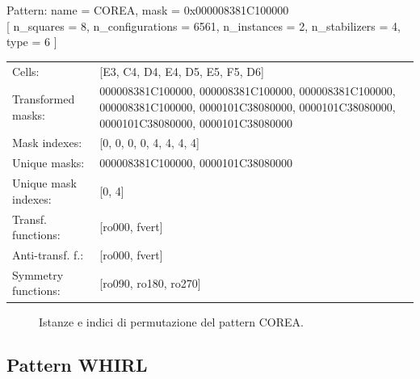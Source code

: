 \begin{tcolorbox}[sharp corners, fontupper=\ttfamily\small, colback=white]
  \noindent Pattern: name = COREA, mask = 0x000008381C100000\\
  {[} n\_squares = 8, n\_configurations = 6561,
  n\_instances = 2, n\_stabilizers = 4, type = 6 { ]}\\[1.0ex]
  \begin{tabularx}{\textwidth}{@{} p{3.5cm} X @{}}
    Cells:               & {[}E3, C4, D4, E4, D5, E5, F5, D6{]}\\[0.5ex]
    Transformed masks:   & 000008381C100000, 000008381C100000, 000008381C100000, 000008381C100000, 0000101C38080000, 0000101C38080000, 0000101C38080000, 0000101C38080000\\[0.5ex]
    Mask indexes:        & {[}0, 0, 0, 0, 4, 4, 4, 4{]}\\[0.5ex]
    Unique masks:        & 000008381C100000, 0000101C38080000\\[0.5ex]
    Unique mask indexes: & {[}0, 4{]}\\[0.5ex]
    Transf. functions:   & {[}ro000, fvert{]}\\[0.5ex]
    Anti-transf. f.:     & {[}ro000, fvert{]}\\[0.5ex]
    Symmetry functions:  & {[}ro090, ro180, ro270{]}\\[0.5ex]
  \end{tabularx}
\end{tcolorbox}

\begin{figure}[htbp]
  \centering
   \hfill
   \hfill
   \hfill
  \vspace{0.3cm}
   \hfill
   \hfill
   \hfill
  \caption{Istanze e indici di permutazione del pattern COREA.}
\end{figure}

\newpage

\subsection{Pattern WHIRL}

